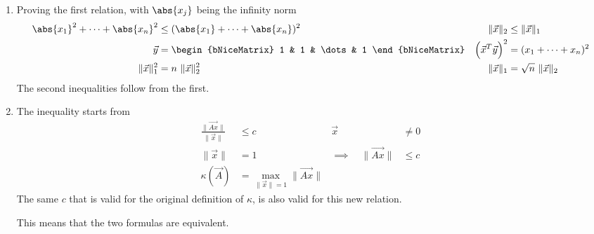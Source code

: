 \begin{enumerate}
\begin{enumerate}
              \item Proving the first relation, with $ \abs{x_j} $ being the
                    infinity norm
                    \begin{align}
                        \abs{x_1}^2 + \dots + \abs{x_n}^2
                         & \leq (\abs{x_1} + \dots + \abs{x_n})^2 &
                        \lVert \vec{x} \rVert_2
                         & \leq \lVert \vec{x} \rVert_1             \\
                        \vec{y}
                         & = \begin{bNiceMatrix}
                                 1 & 1 & \dots & 1
                             \end{bNiceMatrix}                  &
                        \Big(\vec{x}^T \vec{y}\Big)^2
                         & = (x_1 + \dots + x_n)^2                  \\
                        \lVert \vec{x} \rVert_1^2
                         & = n\ \lVert \vec{x} \rVert_2^2         &
                        \lVert \vec{x} \rVert_1
                         & = \sqrt{n}\ \lVert \vec{x} \rVert_2
                    \end{align}
                    The second inequalities follow from the first.

              \item The inequality starts from
                    \begin{align}
                        \frac{\lVert \vec{Ax} \rVert}{\lVert \vec{x} \rVert}
                                                              & \leq c &
                        \vec{x}                               & \neq 0   \\
                        \lVert \vec{x} \rVert                 & = 1    &
                        \implies \quad \lVert \vec{Ax} \rVert & \leq c   \\
                        \kappa(\vec{A})                       &
                        = \max_{\lVert \vec{x} \rVert = 1} \lVert \vec{Ax} \rVert
                    \end{align}
                    The same $ c $ that is valid for the original definition of
                    $ \kappa $, is also valid for this new relation. \par
                    This means that the two formulas are equivalent.


\end{enumerate}
\end{enumerate}
